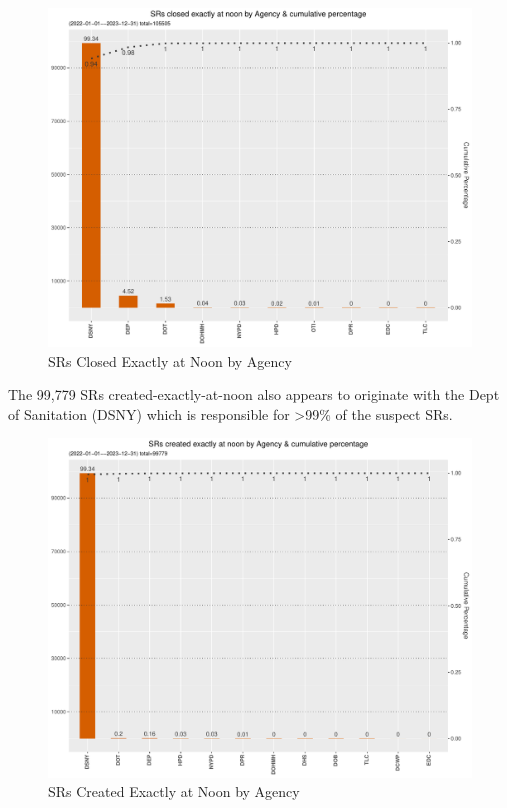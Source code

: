 \documentclass[12pt, titlepage]{article}
\begin{document}
{	\begin{figure}[tbp]
		\centering
		\includegraphics[width = \textwidth]
		{closed_at_noon_chart.pdf}
		\caption{SRs Closed Exactly at Noon by Agency}
		\label{fig:noon-closed}
	\end{figure}	
	
	The 99,779 SRs created-exactly-at-noon also appears to 
	originate with the Dept of Sanitation (DSNY) which is responsible 
	for \textgreater99\% of the suspect SRs.
	
	\begin{figure}[tbp]
		\centering
		\includegraphics[width = \textwidth]{created_at_noon_chart.pdf}
		\caption{SRs Created Exactly at Noon by Agency}
		\label{fig:noon-created}
	\end{figure}		
		
}
\end{document}
